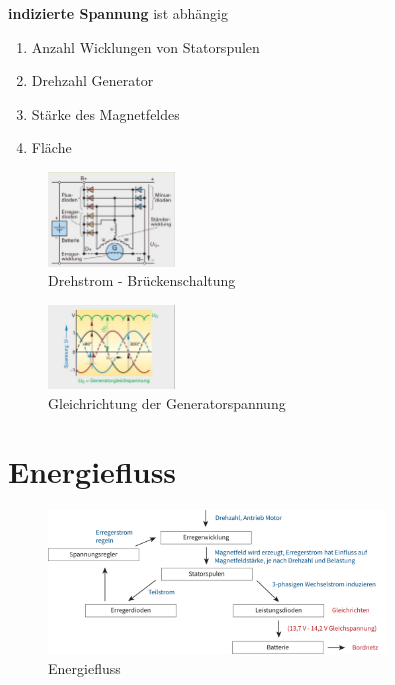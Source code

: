 \textbf{indizierte Spannung} ist abhängig

\begin{enumerate}
\item
  Anzahl Wicklungen von Statorspulen
\item
  Drehzahl Generator
\item
  Stärke des Magnetfeldes
\item
  Fläche
\end{enumerate}

\begin{figure}[!ht]%
\centering
\includegraphics[width=0.3\textwidth]{images/Generator/Generator-6.pdf}
\caption{Drehstrom - Brückenschaltung}
\end{figure}

\begin{figure}[!ht]%
\centering
\includegraphics[width=0.3\textwidth]{images/Generator/Generator-7.pdf}
\caption{Gleichrichtung der Generatorspannung}
\end{figure}

\newpage

\section{Energiefluss}\label{energiefluss}

\begin{figure}[!ht]%
\centering
\includegraphics[width=0.8\textwidth]{images/Generator/Generator-Energiefluss.pdf}
\caption{Energiefluss}
\end{figure}

